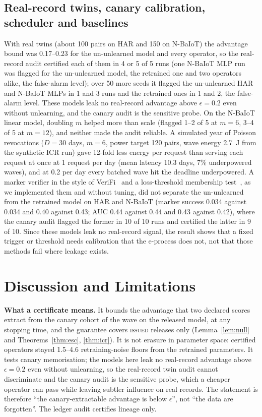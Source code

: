 \documentclass[journal]{IEEEtran}
\begin{document}
\subsection{Real-record twins, canary calibration, scheduler and baselines}
With real twins (about 100 pairs on HAR and 150 on N-BaIoT) the advantage bound was 0.17--0.23 for the un-unlearned model and every operator, so the real-record audit certified each of them in 4 or 5 of 5 runs (one N-BaIoT MLP run was flagged for the un-unlearned model, the retrained one and two operators alike, the false-alarm level); over 50 more seeds it flagged the un-unlearned HAR and N-BaIoT MLPs in 1 and 3 runs and the retrained ones in 1 and 2, the false-alarm level. These models leak no real-record advantage above $\epsilon=0.2$ even without unlearning, and the canary audit is the sensitive probe. On the N-BaIoT linear model, doubling $m$ helped more than scale (flagged 1--2 of 5 at $m=6$, 3--4 of 5 at $m=12$), and neither made the audit reliable. A simulated year of Poisson revocations ($D=30$ days, $m=6$, power target 120 pairs, wave energy 2.7~J from the synthetic ICR run) gave 12-fold less energy per request than serving each request at once at 1 request per day (mean latency 10.3 days, 7\% underpowered waves), and at 0.2 per day every batched wave hit the deadline underpowered. A marker verifier in the style of VeriFi~\cite{gao2024verifi} and a loss-threshold membership test~\cite{yeom2018}, as we implemented them and without tuning, did not separate the un-unlearned from the retrained model on HAR and N-BaIoT (marker success 0.034 against 0.034 and 0.40 against 0.43; AUC 0.44 against 0.44 and 0.43 against 0.42), where the canary audit flagged the former in 10 of 10 runs and certified the latter in 9 of 10. Since these models leak no real-record signal, the result shows that a fixed trigger or threshold needs calibration that the e-process does not, not that those methods fail where leakage exists.

\section{Discussion and Limitations}
\label{sec:disc}
\textbf{What a certificate means.} It bounds the advantage that two declared scores extract from the canary cohort of the wave on the released model, at any stopping time, and the guarantee covers \textsc{issued} releases only (Lemma~\ref{lem:null} and Theorems~\ref{thm:esc}, \ref{thm:icr}). It is not erasure in parameter space: certified operators stayed 1.5--4.6 retraining-noise floors from the retrained parameters. It tests canary memorisation; the models here leak no real-record advantage above $\epsilon=0.2$ even without unlearning, so the real-record twin audit cannot discriminate and the canary audit is the sensitive probe, which a cheaper operator can pass while leaving subtler influence on real records. The statement is therefore ``the canary-extractable advantage is below $\epsilon$'', not ``the data are forgotten''. The ledger audit certifies lineage only.
\end{document}
